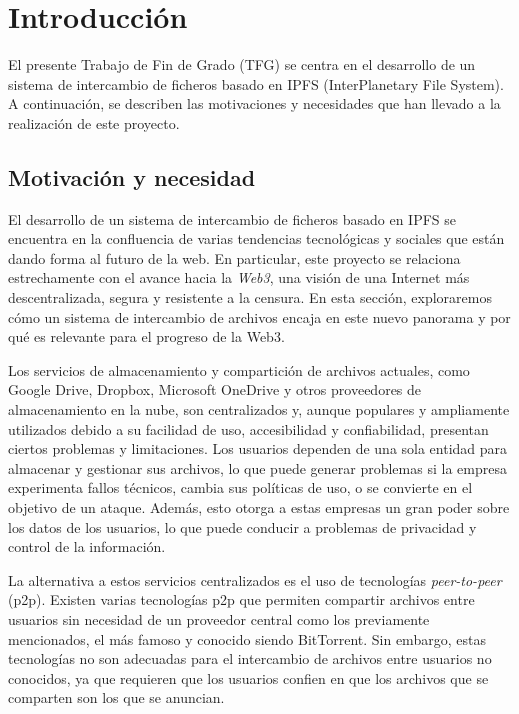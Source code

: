 \chapter{Introducción}
El presente Trabajo de Fin de Grado (TFG) se centra en el desarrollo de un sistema de intercambio de ficheros basado en
IPFS (InterPlanetary File System)\cite{IPFSPowersDistributed}. A continuación, se describen las motivaciones y necesidades que han llevado a la realización de este proyecto.
\section{Motivación y necesidad}

El desarrollo de un sistema de intercambio de ficheros basado en IPFS se encuentra en la confluencia de varias tendencias
tecnológicas y sociales que están dando forma al futuro de la web. En particular, este proyecto se relaciona estrechamente
con el avance hacia la \textit{Web3}\cite{Web32023}, una visión de una Internet más descentralizada, segura y resistente a la censura.
En esta sección, exploraremos cómo un sistema de intercambio de archivos encaja en este nuevo panorama y por qué es relevante para el progreso de la Web3.

Los servicios de almacenamiento y compartición de archivos actuales, como Google Drive, Dropbox, Microsoft OneDrive y otros proveedores de almacenamiento en la
nube, son centralizados y, aunque populares y ampliamente utilizados debido a su facilidad de uso, accesibilidad y confiabilidad,
presentan ciertos problemas y limitaciones. Los usuarios dependen de una sola entidad para almacenar y gestionar sus archivos, lo que puede
generar problemas si la empresa experimenta fallos técnicos, cambia sus políticas de uso, o se convierte en el objetivo de un ataque.
Además, esto otorga a estas empresas un gran poder sobre los datos de los usuarios, lo que puede conducir a problemas de privacidad y control de la información.

La alternativa a estos servicios centralizados es el uso de tecnologías \textit{peer-to-peer} (p2p). Existen varias tecnologías p2p que permiten compartir archivos
entre usuarios sin necesidad de un proveedor central como los previamente mencionados, el más famoso y conocido siendo BitTorrent. Sin embargo, estas tecnologías no son adecuadas para el intercambio de archivos entre usuarios no conocidos, ya que requieren que los usuarios confien en que los archivos que se comparten son los que se anuncian.

